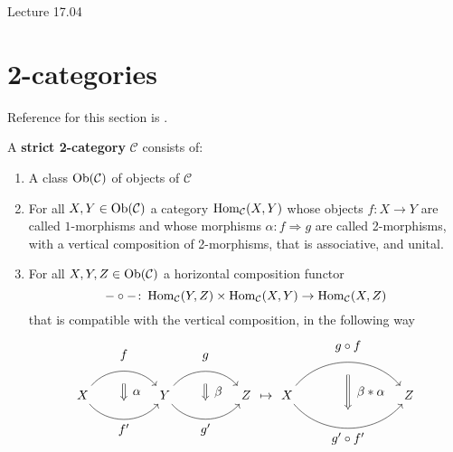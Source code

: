 Lecture 17.04

\section{2-categories}

Reference for this section is \cite[ch. 2.2.1- 2.2.3]{kerodon}.

\begin{defi}
\label{strict_twocat_defi}
	A \textbf{strict 2-category} $ \mathcal{ C } $ 
	consists of:
	\begin{enumerate}
		\item 
		A class $ \operatorname{Ob} ( \mathcal{C} ) $ of objects of $ \mathcal{C} $
		
		\item 
		For all $ X , Y \in \operatorname{Ob}( \mathcal{ C } ) $ a category $ \operatorname{Hom}_{ \mathcal{ C } } ( X , Y )$ whose objects 
		$f \colon X \to Y $ are called $1$-morphisms and whose morphisms $ \alpha \colon f \Rightarrow g $ are called 2-morphisms, with a vertical composition of 2-morphisms, that 
		is associative, and unital.
		
		\item 
		For all $ X , Y , Z \in \operatorname{Ob}( \mathcal{C} ) $ a horizontal composition functor
		\[
		-\circ- \colon \operatorname{Hom}_{ \mathcal{ C } } ( Y , Z ) \times \operatorname{Hom}_{ \mathcal{ C } } ( X , Y ) \to \operatorname{Hom}_{ \mathcal{ C } } ( X , Z )
		\]
		that is compatible with the vertical composition, in the following way 
		\[
		\begin{tikzcd}
			X
			\arrow[bend left=50]{rr}[name=U',label=above:$f$]{}
			\arrow[bend right=50]{rr}[name=D',label=below:$f'$]{}
			&&
			Y
			\arrow[shorten <=10pt,shorten >=10pt,Rightarrow,to path={(U')-- node[label=right:$ \alpha $] {} (D')}]{} 
			\arrow[bend left=50]{rr}[name=U'',label=above:$g$]{}
			\arrow[bend right=50]{rr}[name=D'',label=below:$g'$]{}
			&&
			Z
			\arrow[shorten <=10pt,shorten >=10pt,Rightarrow,to path={(U'')-- node[label=right:$\beta$] {} (D'')}]{} 
		\end{tikzcd}
		\mapsto
		\begin{tikzcd}[column sep=1.4cm]
			X
			\arrow[bend left=50]{rr}[name=U',label=above:$g \circ f$]{}
			\arrow[bend right=50]{rr}[name=D',label=below:$g' \circ f'$]{}
			&&
			Z
			\arrow[shorten <=10pt,shorten >=10pt,Rightarrow,to path={(U')-- node[label=right:$ \beta * \alpha $] {} (D')}]{} 
		\end{tikzcd} 	
		\]
		

\end{enumerate}
\end{defi}
